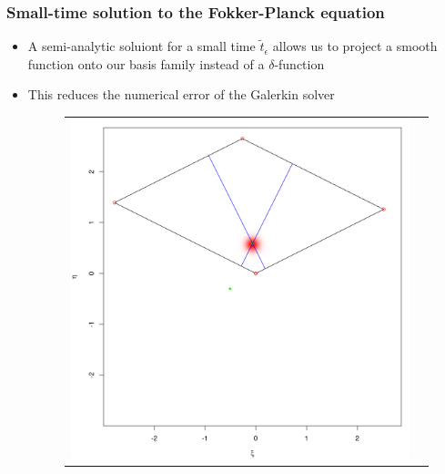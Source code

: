 \documentclass{beamer}
\begin{document}
\begin{frame}
  \frametitle{Small-time solution to the Fokker-Planck equation}
  \begin{itemize}
  \item A semi-analytic soluiont for a small time $\tilde{t}_\epsilon$ allows us to project a smooth function onto our basis family instead of a $\delta$-function
  \item This reduces the numerical error of the Galerkin solver

    \begin{figure}
  \centering
  \begin{tabular}{cc}
    \begin{minipage}{0.3\textwidth}
      \centering
      \includegraphics[width=1\linewidth]{../small-time-solution.png}
    \end{minipage}
    & \begin{minipage}{0.3\textwidth}
      \centering

\end{minipage}
\end{tabular}
\end{figure}
\end{itemize}
\end{frame}
\end{document}
